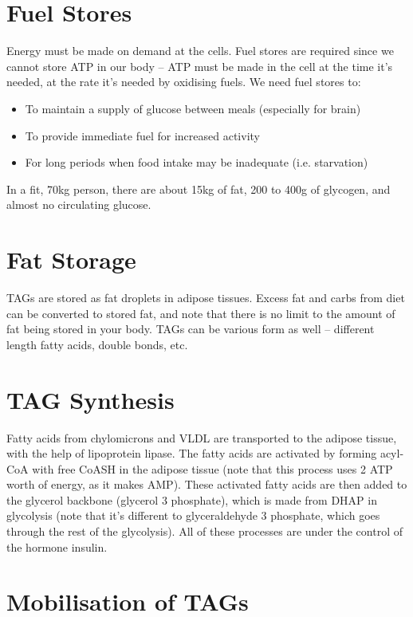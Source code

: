\section{Fuel Stores}

Energy must be made on demand at the cells.
Fuel stores are required since we cannot store ATP in our body -- ATP must be made in the cell at the time it's needed, at the rate it's needed by oxidising fuels.
We need fuel stores to:
\begin{itemize}
\item To maintain a supply of glucose between meals (especially for brain)
\item To provide immediate fuel for increased activity
\item For long periods when food intake may be inadequate (i.e. starvation)
\end{itemize}
In a fit, 70kg person, there are about 15kg of fat, 200 to 400g of glycogen, and almost no circulating glucose.

\section{Fat Storage}

TAGs are stored as fat droplets in adipose tissues.
Excess fat and carbs from diet can be converted to stored fat, and note that there is no limit to the amount of fat being stored in your body.
TAGs can be various form as well -- different length fatty acids, double bonds, etc.

\section{TAG Synthesis}

Fatty acids from chylomicrons and VLDL are transported to the adipose tissue, with the help of lipoprotein lipase.
The fatty acids are activated by forming acyl-CoA with free CoASH in the adipose tissue (note that this process uses 2 ATP worth of energy, as it makes AMP).
These activated fatty acids are then added to the glycerol backbone (glycerol 3 phosphate), which is made from DHAP in glycolysis (note that it's different to glyceraldehyde 3 phosphate, which goes through the rest of the glycolysis).
All of these processes are under the control of the hormone insulin.

\section{Mobilisation of TAGs}

